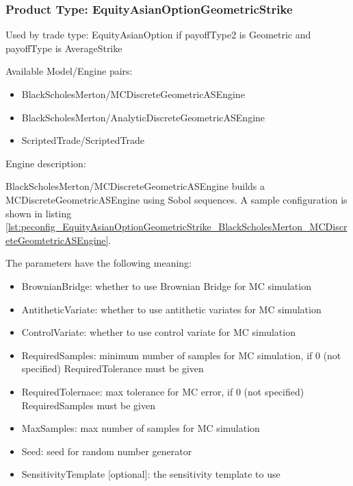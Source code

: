 \subsubsection{Product Type: EquityAsianOptionGeometricStrike}

Used by trade type: EquityAsianOption if payoffType2 is Geometric and payoffType is AverageStrike

Available Model/Engine pairs:

\begin{itemize}
  \item BlackScholesMerton/MCDiscreteGeometricASEngine
  \item BlackScholesMerton/AnalyticDiscreteGeometricASEngine
  \item ScriptedTrade/ScriptedTrade
\end{itemize}

Engine description:

BlackScholesMerton/MCDiscreteGeometricASEngine builds a MCDiscreteGeometricASEngine using Sobol sequences. A sample
configuration is shown in listing
\ref{lst:peconfig_EquityAsianOptionGeometricStrike_BlackScholesMerton_MCDiscreteGeomtetricASEngine}.

The parameters have the following meaning:

\begin{itemize}
\item BrownianBridge: whether to use Brownian Bridge for MC simulation
\item AntitheticVariate: whether to use antithetic variates for MC simulation
\item ControlVariate: whether to use control variate for MC simulation
\item RequiredSamples: minimum number of samples for MC simulation, if 0 (not specified) RequiredTolerance must be given
\item RequiredTolernace: max tolerance for MC error, if 0 (not specified) RequiredSamples must be given
\item MaxSamples: max number of samples for MC simulation
\item Seed: seed for random number generator
\item SensitivityTemplate [optional]: the sensitivity template to use 
\end{itemize}

